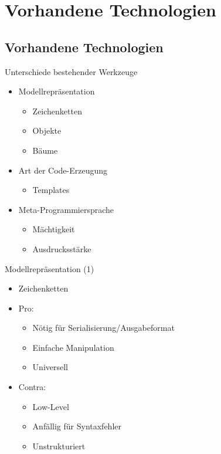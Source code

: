 \documentclass{beamer}
\begin{document}
\section{Vorhandene Technologien}
\subsection{Vorhandene Technologien}

\begin{frame}{Unterschiede bestehender Werkzeuge}
  \begin{itemize}
  \item Modellrepräsentation
    \begin{itemize}
    \item Zeichenketten
    \item Objekte
    \item Bäume
    \end{itemize}
  \item Art der Code-Erzeugung
    \begin{itemize}
    \item Templates
    \end{itemize}
  \item Meta-Programmiersprache
    \begin{itemize}
    \item Mächtigkeit
    \item Ausdrucksstärke
    \end{itemize}
  \end{itemize}
\end{frame}

\begin{frame}{Modellrepräsentation (1)}
  \begin{itemize}
  \item Zeichenketten
  \item Pro:
    \begin{itemize}
    \item Nötig für Serialisierung/Ausgabeformat
    \item Einfache Manipulation
    \item Universell
    \end{itemize}
  \item Contra:
    \begin{itemize}
    \item Low-Level
    \item Anfällig für Syntaxfehler
    \item Unstrukturiert
    \end{itemize}
  \end{itemize} 
\end{frame}
\end{document}
